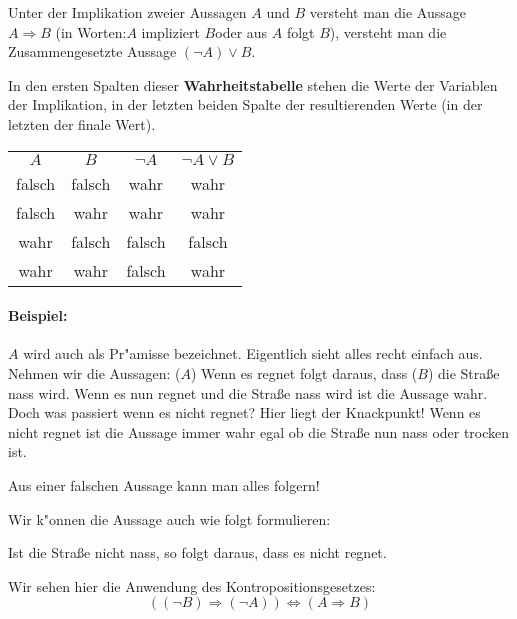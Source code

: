 \begin{definition}[Implikation]
Unter der Implikation zweier Aussagen $A$ und $B$ versteht man die Aussage $A \Rightarrow B$ (in Worten:\glqq $A$ impliziert $B$\grqq oder \glqq aus $A$ folgt $B$\grqq ), versteht man die Zusammengesetzte Aussage $ (\neg A) \lor B$.
\end{definition}
In den ersten Spalten dieser \textbf{Wahrheitstabelle} stehen die Werte der Variablen der Implikation, in der letzten beiden Spalte der resultierenden Werte (in der letzten der finale Wert).
\begin{center}
\begin{tabular}{c|c||c||c}
$A$& $B$ &$\neg A$&  $\neg A \lor B$  \\ 
 \cellcolor{ared}falsch &  \cellcolor{ared}falsch & \cellcolor{agreen}wahr  & \cellcolor{agreen}wahr  \\ 
 \cellcolor{ared}falsch & \cellcolor{agreen}wahr & \cellcolor{agreen}wahr  &  \cellcolor{agreen}wahr  \\ 
\cellcolor{agreen}wahr &  \cellcolor{ared}falsch & \cellcolor{ared} falsch  &  \cellcolor{ared}falsch  \\ 
\cellcolor{agreen}wahr & \cellcolor{agreen}wahr & \cellcolor{ared} falsch  &  \cellcolor{agreen}wahr  \\ 
\hline
\end{tabular}
\end{center}

\paragraph*{Beispiel:}
$A$ wird auch als Pr"amisse bezeichnet. Eigentlich sieht alles recht einfach aus. Nehmen wir die Aussagen: ($A$) \glqq Wenn es regnet folgt daraus, dass ($B$) die Stra{\ss}e nass wird\grqq . Wenn es nun regnet und die Stra{\ss}e nass wird ist die Aussage wahr. Doch was passiert wenn es nicht regnet? Hier liegt der Knackpunkt! Wenn es nicht regnet ist die Aussage immer wahr egal ob die Stra{\ss}e nun nass oder trocken ist.
\begin{center}
Aus einer falschen Aussage kann man alles folgern!
\end{center}
Wir k"onnen die Aussage auch wie folgt formulieren:
\begin{center}
\glqq Ist die Stra{\ss}e nicht nass, so folgt daraus, dass es nicht regnet.\grqq
\end{center}
Wir sehen hier die Anwendung des Kontropositionsgesetzes:
\begin{equation*}
((\neg B) \Rightarrow (\neg A)) \iff (A \Rightarrow B)
\end{equation*}

